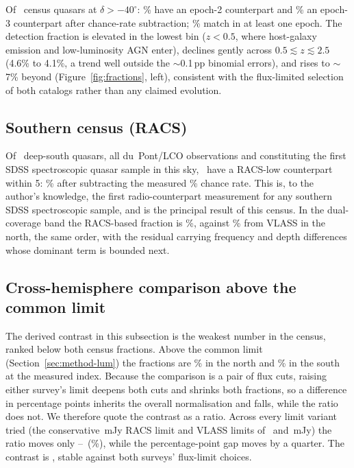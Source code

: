 \documentclass[twocolumn]{aastex631}
\begin{document}
Of \drNorthCensus\ census quasars at $\delta > -40^\circ$: \drNorthEtwoPct\% have an epoch-2
counterpart and \drNorthEthreePct\% an epoch-3 counterpart after chance-rate subtraction;
\drNorthAnyPct\% match in at least one epoch. The detection fraction is elevated in the
lowest bin ($z<0.5$, where host-galaxy emission and low-luminosity AGN enter), declines
gently across $0.5 \lesssim z \lesssim 2.5$ (4.6\% to 4.1\%, a trend well outside the
$\sim$0.1\,pp binomial errors), and rises to $\sim$7\% beyond
(Figure~\ref{fig:fractions}, left), consistent with the flux-limited selection of both
catalogs rather than any claimed evolution.

\subsection{Southern census (RACS)}

Of \drSouthCensus\ deep-south quasars, all du~Pont/LCO observations and constituting the
first SDSS spectroscopic quasar sample in this sky, \drSouthMatched\ have a RACS-low
counterpart within 5\arcsec: \drSouthPct\% after subtracting the measured \drSouthFmPct\%
chance rate. This is, to the author's knowledge, the first radio-counterpart measurement for any
southern SDSS spectroscopic sample, and is the principal result of this census. In the
dual-coverage band the RACS-based fraction is \drOverlapPct\%, against \drNorthAnyPct\%
from VLASS in the north, the same order, with the residual carrying frequency and depth
differences whose dominant term is bounded next.

\subsection{Cross-hemisphere comparison above the common limit}
\label{sec:contrast}

The derived contrast in this subsection is the weakest number in the census, ranked below
both census fractions. Above the common limit (Section~\ref{sec:method-lum}) the fractions
are \drLumNorthMeasPct\% in the north and \drLumSouthMeasPct\% in the south at the
measured index. Because the
comparison is a pair of flux cuts, raising either survey's limit deepens both cuts and
shrinks both fractions, so a difference in percentage points inherits the overall
normalisation and falls, while the ratio does not. We therefore quote the contrast as a
ratio. Across every limit variant tried (the conservative \drSlimRacsCons\,mJy RACS limit
and VLASS limits of \drSlimVlassConsA\ and \drSlimVlassConsB\,mJy) the ratio moves only
\drRatioLimLo--\drRatioLimHi\ (\drRatioLimSpreadPct\%), while the percentage-point gap moves
by a quarter. The contrast is \drRatioMeas, stable against both surveys' flux-limit choices.
\end{document}
